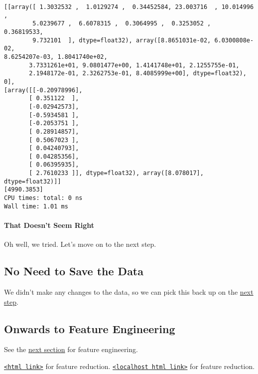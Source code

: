 \documentclass[11pt]{article}
\begin{document}
    \begin{Verbatim}[commandchars=\\\{\}]
[[array([ 1.3032532 ,  1.0129274 ,  0.34452584, 23.003716  , 10.014996  ,
        5.0239677 ,  6.6078315 ,  0.3064995 ,  0.3253052 ,  0.36819533,
        9.732101  ], dtype=float32), array([8.8651031e-02, 6.0300808e-02,
8.6254207e-03, 1.8041740e+02,
       3.7331261e+01, 9.0801477e+00, 1.4141748e+01, 2.1255755e-01,
       2.1948172e-01, 2.3262753e-01, 8.4085999e+00], dtype=float32), 0],
[array([[-0.20978996],
       [ 0.351122  ],
       [-0.02942573],
       [-0.5934581 ],
       [-0.2053751 ],
       [ 0.28914857],
       [ 0.5067023 ],
       [ 0.04240793],
       [ 0.04285356],
       [ 0.06395935],
       [ 2.7610233 ]], dtype=float32), array([8.078017], dtype=float32)]]
[4990.3853]
CPU times: total: 0 ns
Wall time: 1.01 ms
    \end{Verbatim}

    \paragraph{That Doesn't Seem Right}\label{that-doesnt-seem-right}

Oh well, we tried. Let's move on to the next step.

    \subsection{No Need to Save the Data}\label{no-need-to-save-the-data}

We didn't make any changes to the data, so we can pick this back up on
the \href{../2-features/features.ipynb}{next step}.

    \subsection{Onwards to Feature
Engineering}\label{onwards-to-feature-engineering}

See the \href{../2-features/features.ipynb}{next section} for feature
engineering.

\href{https://nbviewer.org/github/ahester57/ai_workshop/blob/master/notebooks/time_for_crab/2-features/features.ipynb}{\texttt{\textless{}html\ link\textgreater{}}}
for feature reduction.
\href{../2-features/features.html}{\texttt{\textless{}localhost\ html\ link\textgreater{}}}
for feature reduction.


    
    
    
\end{document}
